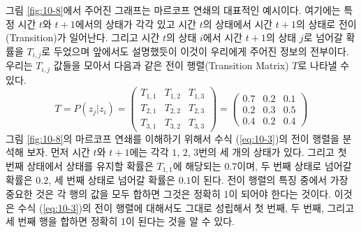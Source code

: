 \documentclass[a4paper]{oblivoir}
\begin{document}
그림 \ref{fig:10-8}에서 주어진 그래프는 마르코프 연쇄의 대표적인 예시이다. 여기에는 특정 시간 $t$와 $t+1$에서의 상태가 각각 있고 시간 $t$의 상태에서 시간 $t+1$의 상태로 전이(Transition)가 일어난다. 그리고 시간 $t$의 상태 $i$에서 시간 $t+1$의 상태 $j$로 넘어갈 확률을  $T_{i,j}$로 두었으며 앞에서도 설명했듯이 이것이 우리에게 주어진 정보의 전부이다. 우리는 $T_{i,j}$ 값들을 모아서 다음과 같은 전이 행렬(Transition Matrix) $T$로 나타낼 수 있다. 
\begin{equation}
T = P(z_j|z_i) = \left( \begin{array}{ccc} T_{1,1} & T_{1,2} & T_{1,3} \\ T_{2,1} & T_{2,2} & T_{2,3} \\ T_{3,1} & T_{3,2} & T_{3,3} \end{array} \right) = \left( \begin{array}{ccc} 0.7 & 0.2 & 0.1 \\ 0.2 & 0.3 & 0.5 \\ 0.4 & 0.2 & 0.4 \end{array} \right) 
\label{eq:10-3}
\end{equation} 
그림 \ref{fig:10-8}의 마르코프 연쇄를 이해하기 위해서 수식 (\ref{eq:10-3})의 전이 행렬을 분석해 보자. 먼저 시간 $t$와 $t+1$에는 각각 $1$, $2$, $3$번의 세 개의 상태가 있다. 그리고 첫 번째 상태에서 상태를 유지할 확률은 $T_{1,1}$에 해당되는 $0.7$이며, 두 번째 상태로 넘어갈 확률은 $0.2$, 세 번째 상태로 넘어갈 확률은 $0.1$이 된다. 전이 행렬의 특징 중에서 가장 중요한 것은 각 행의 값을 모두 합하면 그것은 정확히 1이 되어야 한다는 것이다. 이것은 수식 (\ref{eq:10-3})의 전이 행렬에 대해서도 그대로 성립해서 첫 번째, 두 번째, 그리고 세 번째 행을 합하면 정확히 1이 된다는 것을 알 수 있다. \\
\end{document}
